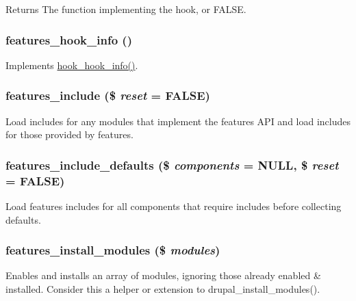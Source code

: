 \begin{DoxyReturn}{Returns}
The function implementing the hook, or FALSE. 
\end{DoxyReturn}
\hypertarget{features_8module_a7d3ed140b4b5553cbf7fc46f0bb42af2}{
\subsubsection[{features\_\-hook\_\-info}]{\setlength{\rightskip}{0pt plus 5cm}features\_\-hook\_\-info ()}}
\label{features_8module_a7d3ed140b4b5553cbf7fc46f0bb42af2}
Implements \hyperlink{group__hooks_ga65142e7864f445483786087d180a2010}{hook\_\-hook\_\-info()}. \hypertarget{features_8module_aa808105e0eafb3744d0cdcfe50802456}{
\subsubsection[{features\_\-include}]{\setlength{\rightskip}{0pt plus 5cm}features\_\-include (\$ {\em reset} = {\ttfamily FALSE})}}
\label{features_8module_aa808105e0eafb3744d0cdcfe50802456}
Load includes for any modules that implement the features API and load includes for those provided by features. \hypertarget{features_8module_a359c52c08e57a3bdd13594abd116543e}{
\subsubsection[{features\_\-include\_\-defaults}]{\setlength{\rightskip}{0pt plus 5cm}features\_\-include\_\-defaults (\$ {\em components} = {\ttfamily NULL}, \/  \$ {\em reset} = {\ttfamily FALSE})}}
\label{features_8module_a359c52c08e57a3bdd13594abd116543e}
Load features includes for all components that require includes before collecting defaults. \hypertarget{features_8module_a379679b547f18695cf0e547fe936b002}{
\subsubsection[{features\_\-install\_\-modules}]{\setlength{\rightskip}{0pt plus 5cm}features\_\-install\_\-modules (\$ {\em modules})}}
\label{features_8module_a379679b547f18695cf0e547fe936b002}
Enables and installs an array of modules, ignoring those already enabled \& installed. Consider this a helper or extension to drupal\_\-install\_\-modules().


